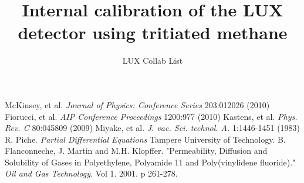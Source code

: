 \documentclass[12pt,twocolumn]{article}
\begin{document}
\title{Internal calibration of the LUX detector using tritiated methane}
\author{LUX Collab List}

\twocolumn[
\begin{@twocolumnfalse}
\maketitle



\end{@twocolumnfalse}
]










   





\begin{thebibliography}{1}

 McKinsey, et al.  \emph{Journal of Physics: Conference Series} 203:012026 (2010) 
 Fiorucci, et al.  \emph{AIP Conference Proceedings} 1200:977 (2010)
 Kastens, et al. \emph{Phys. Rev. C} 80:045809 (2009)
 Miyake, et al.  \emph{J. vac. Sci. technol. A.} 1:1446-1451 (1983)
 R. Piche. \emph{Partial Differential Equations} Tampere University of Technology.
 B. Flanconneche, J. Martin and M.H. Klopffer. "Permeability, Diffusion and Solubility of Gases in Polyethylene, Polyamide 11 and Poly(vinylidene fluoride)." \emph{Oil and Gas Technology}. Vol 1. 2001. p 261-278.


\end{thebibliography}
\end{document}
